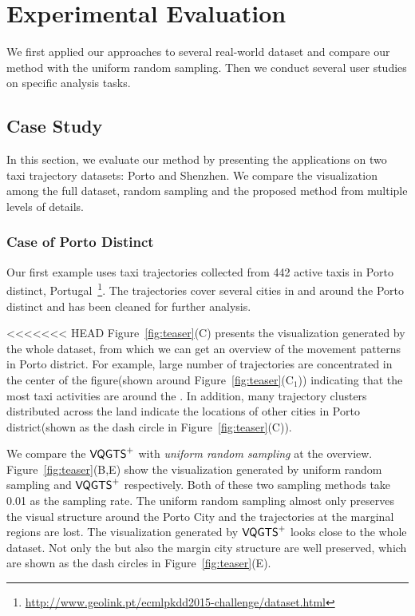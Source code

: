 \section{Experimental Evaluation}\label{sec:exp}
We first applied our approaches to several real-world dataset and compare our method with the uniform random sampling. Then we conduct several user studies on specific analysis tasks.
\subsection{Case Study}
In this section, we evaluate our method by presenting the applications on two taxi trajectory datasets: Porto and Shenzhen. We compare the visualization among the full dataset, random sampling and the proposed method from multiple levels of details.
\subsubsection{Case of Porto Distinct}
Our first example uses taxi trajectories collected from 442 active taxis in Porto distinct, Portugal~\footnote{\url{http://www.geolink.pt/ecmlpkdd2015-challenge/dataset.html}}. The trajectories cover several cities in and around the Porto distinct and has been cleaned for further analysis.


<<<<<<< HEAD
Figure~\ref{fig:teaser}(C) presents the visualization generated by the whole dataset, from which we can get an overview of the movement patterns in Porto district. For example, large number of trajectories are concentrated in the center of the figure(shown around Figure~\ref{fig:teaser}(C$_1$)) indicating that the most taxi activities are around the . In addition, 
many trajectory clusters distributed across the land indicate the locations of other cities in Porto district(shown as the dash circle in Figure~\ref{fig:teaser}(C)). 

We compare the $\mathsf{VQGTS}^{+}$ with \textit{uniform random sampling} at the overview. 
Figure~\ref{fig:teaser}(B,E) show the visualization generated by uniform random sampling and $\mathsf{VQGTS}^{+}$ respectively. Both of these two sampling methods take 0.01 as the sampling rate. The uniform random sampling almost only preserves the visual structure around the Porto City and the trajectories at the marginal regions are lost.
The visualization generated by $\mathsf{VQGTS}^{+}$ looks close to the whole dataset. Not only the  but also the margin city structure are well preserved, which are shown as the dash circles in Figure~\ref{fig:teaser}(E).
 

